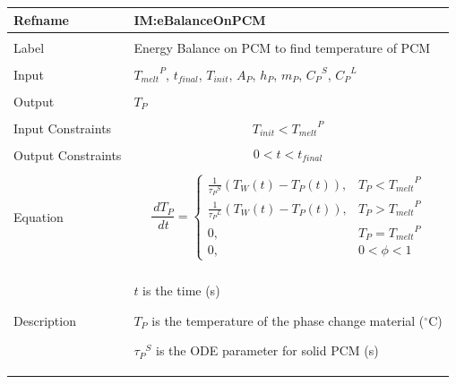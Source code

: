 \documentclass[12pt]{article}
\begin{document}
\noindent \begin{minipage}{\textwidth}
\begin{tabular}{>{\raggedright}p{}>{\raggedright\arraybackslash}p{}}
\toprule \textbf{Refname} & \textbf{IM:eBalanceOnPCM}
\label{IM:eBalanceOnPCM}
\\ \midrule \\
Label & Energy Balance on PCM to find temperature of PCM
\\ \midrule \\
Input & ${{T_{melt}}^{P}}$, ${t_{final}}$, ${T_{init}}$, ${A_{P}}$, ${h_{P}}$, ${m_{P}}$, ${{C_{P}}^{S}}$, ${{C_{P}}^{L}}$
\\ \midrule \\
Output & ${T_{P}}$
\\ \midrule \\
Input Constraints & \begin{displaymath}
                    {T_{init}}<{{T_{melt}}^{P}}
                    \end{displaymath}
\\ \midrule \\
Output Constraints & \begin{displaymath}
                     0<t<{t_{final}}
                     \end{displaymath}
\\ \midrule \\
Equation & \begin{displaymath}
           \frac{\,d{T_{P}}}{\,dt}=\begin{cases}
\frac{1}{{{τ_{P}}^{S}}} \left({T_{W}}\left(t\right)-{T_{P}}\left(t\right)\right), & {T_{P}}<{{T_{melt}}^{P}}\\
\frac{1}{{{τ_{P}}^{L}}} \left({T_{W}}\left(t\right)-{T_{P}}\left(t\right)\right), & {T_{P}}>{{T_{melt}}^{P}}\\
0, & {T_{P}}={{T_{melt}}^{P}}\\
0, & 0<ϕ<1
\end{cases}
           \end{displaymath}
\\ \midrule \\
Description & \begin{symbDescription}
              \item{$t$ is the time (s)}
              \item{${T_{P}}$ is the temperature of the phase change material (${}^{\circ}$C)}
              \item{${{τ_{P}}^{S}}$ is the ODE parameter for solid PCM (s)}

\end{symbDescription}
\end{tabular}
\end{minipage}
\end{document}
